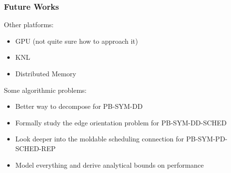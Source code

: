 \documentclass{beamer}
\begin{document}
\begin{frame}
  \frametitle{Future Works}

  Other platforms:
  \begin{itemize}
  \item GPU (not quite sure how to approach it)
  \item KNL
  \item Distributed Memory
  \end{itemize}

  Some algorithmic problems:
  \begin{itemize}
  \item Better way to decompose for \textsc{PB-SYM-DD}
  \item Formally study the edge orientation problem for \textsc{PB-SYM-DD-SCHED}
  \item Look deeper into the moldable scheduling connection for \textsc{PB-SYM-PD-SCHED-REP}
  \item Model everything and derive analytical bounds on performance
  \end{itemize}
\end{frame}


\end{document}
